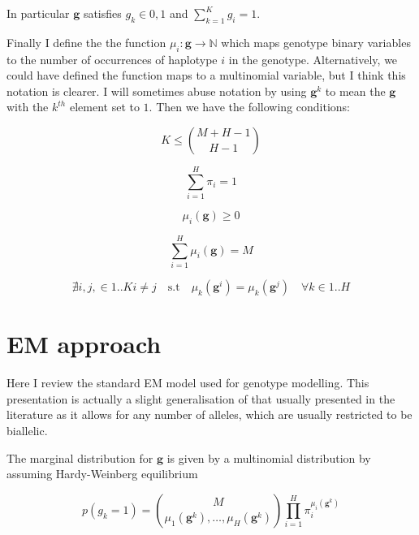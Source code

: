 \documentclass{article}
\begin{document}
In particular $\boldsymbol{g}$ satisfies $g_k \in {0, 1}$ and $\sum_{k = 1}^{K} g_i = 1$.

Finally I define the the function $\mu_i : \boldsymbol{g} \rightarrow \mathbb{N}$ which maps genotype binary variables to the number of occurrences of haplotype $i$ in the genotype. Alternatively, we could have defined the function maps to a multinomial variable, but I think this notation is clearer. I will sometimes abuse notation by using $\boldsymbol{g}^k$ to mean the $\boldsymbol{g}$ with the $k^{th}$ element set to $1$. Then we have the following conditions:

\begin{equation} 
    K \le \binom{M + H - 1}{H - 1}
\end{equation}

\begin{equation} 
    \sum_{i = 1}^{H} \pi_i = 1
\end{equation}

\begin{equation} 
    \mu_i(\boldsymbol{g}) \ge 0
\end{equation}

\begin{equation} 
    \sum_{i = 1}^{H} \mu_i(\boldsymbol{g}) = M
\end{equation}

\begin{equation} 
    \nexists i,j,\in {1..K} i \ne j \quad \text{s.t} \quad \mu_k(\boldsymbol{g}^i) = \mu_k(\boldsymbol{g}^j) \quad \forall k \in {1..H}
\end{equation}

\section{EM approach}

Here I review the standard EM model used for genotype modelling. This presentation is actually a slight generalisation of that usually presented in the literature as it allows for any number of alleles, which are usually restricted to be biallelic.

The marginal distribution for $\boldsymbol{g}$ is given by a multinomial distribution by assuming Hardy-Weinberg equilibrium

\begin{equation} 
    p(g_k = 1) = \binom{M}{\mu_1(\boldsymbol{g}^k),\dots,\mu_H(\boldsymbol{g}^k)} \prod_{i = 1}^H \pi_i^{\mu_i(\boldsymbol{g}^k)}
\end{equation}
\end{document}
